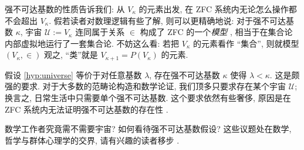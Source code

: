 强不可达基数的性质告诉我们: 从 $V_\kappa$ 的元素出发, 在 ZFC 系统内无论怎么操作都不会超出 $V_\kappa$. 假若读者对数理逻辑有些了解, 则可以更精确地说: 对于强不可达基数 $\kappa$, 宇宙 $\mathcal{U} := V_\kappa$ 连同属于关系 $\in$ 构成了 ZFC 的一个\emph{模型} \cite[Lemma 12.13]{Je03}, 相当于在集合论内部虚拟地运行了一套集合论. 不妨这么看: 若把 $V_\kappa$ 的元素看作 ``集合'', 则就模型 $(V_\kappa, \in)$ 观之, ``类''就是 $V_{\kappa+1} = P(V_\kappa)$ 的元素.

\begin{remark}
	假设 \ref{hyp:universe} 等价于对任意基数 $\lambda$, 存在强不可达基数 $\kappa$ 使得 $\lambda < \kappa$. 这是颇强的要求. 对于大多数的范畴论构造和数学论证, 我们顶多只要求存在某个宇宙 $\mathcal{U}$; 换言之, 日常生活中只需要单个强不可达基数. 这个要求依然有些奢侈, 原因是在 ZFC 系统内无法证明强不可达基数的存在性 \cite[Theorem 12.12]{Je03}.
\end{remark}

数学工作者究竟需不需要宇宙? 如何看待强不可达基数假设? 这些议题处在数学, 哲学与群体心理学的交界, 请有兴趣的读者移步 \cite{Shu08}.


